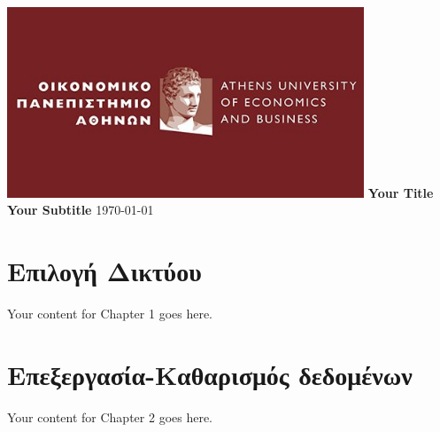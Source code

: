 \documentclass{article}
\begin{document}
	
	\begin{titlepage}
		\centering
		\includegraphics[width=0.8\textwidth]{aueb_logo.jpg}
		\vfill
		\Huge\textbf{Your Title}
		\vspace{1cm}
		\Large\textbf{Your Subtitle}
		\vfill
		\today
	\end{titlepage}
	
	\tableofcontents  %
	
	\newpage  %
	
	\section{Επιλογή Δικτύου}
	Your content for Chapter 1 goes here.
	\label{chap:network_selection}  %
	
	\section{Επεξεργασία-Καθαρισμός δεδομένων}
	Your content for Chapter 2 goes here.
	\label{chap:data_processing}  %
	
\end{document}
